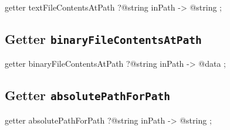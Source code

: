 \begin{galgas4}
getter textFileContentsAtPath ?@string inPath -> @string ;
\end{galgas4}










\subsection{Getter \texttt{binaryFileContentsAtPath}}

\begin{galgas4}
getter binaryFileContentsAtPath ?@string inPath -> @data ;
\end{galgas4}










\subsection{Getter \texttt{absolutePathForPath}}

\begin{galgas4}
getter absolutePathForPath ?@string inPath -> @string ;
\end{galgas4}


